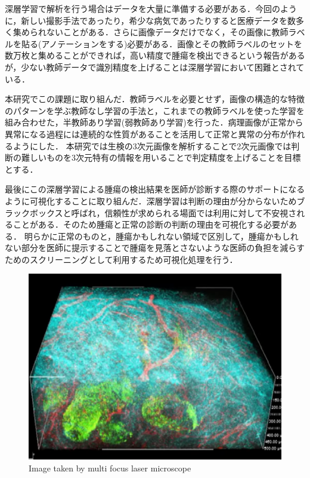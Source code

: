 深層学習で解析を行う場合はデータを大量に準備する必要がある．今回のように，新しい撮影手法であったり，希少な病気であったりすると医療データを数多く集められないことがある．さらに画像データだけでなく，その画像に教師ラベルを貼る(アノテーションをする)必要がある．画像とその教師ラベルのセットを数万枚と集めることができれば，高い精度で腫瘍を検出できるという報告があるが\cite{esteva2017dermatologist}，少ない教師データで識別精度を上げることは深層学習において困難とされている．

本研究でこの課題に取り組んだ．教師ラベルを必要とせず，画像の構造的な特徴のパターンを学ぶ教師なし学習の手法と，これまでの教師ラベルを使った学習を組み合わせた，半教師あり学習(弱教師あり学習)を行った．病理画像が正常から異常になる過程には連続的な性質があることを活用して正常と異常の分布が作れるようにした．
本研究では生検の3次元画像を解析することで2次元画像では判断の難しいものを3次元特有の情報を用いることで判定精度を上げることを目標とする．

最後にこの深層学習による腫瘍の検出結果を医師が診断する際のサポートになるように可視化することに取り組んだ．深層学習は判断の理由が分からないためブラックボックスと呼ばれ，信頼性が求められる場面では利用に対して不安視されることがある．そのため腫瘍と正常の診断の判断の理由を可視化する必要がある．
明らかに正常のものと，腫瘍かもしれない領域で区別して，腫瘍かもしれない部分を医師に提示することで腫瘍を見落とさないような医師の負担を減らすためのスクリーニングとして利用するため可視化処理を行う．

\begin{figure}[H]
	\centering
	\includegraphics[width=0.7\linewidth]{fig/chapter1/microscope}
	\caption{Image taken by multi focus laser microscope}
	\label{fig:microscope}
\end{figure}

